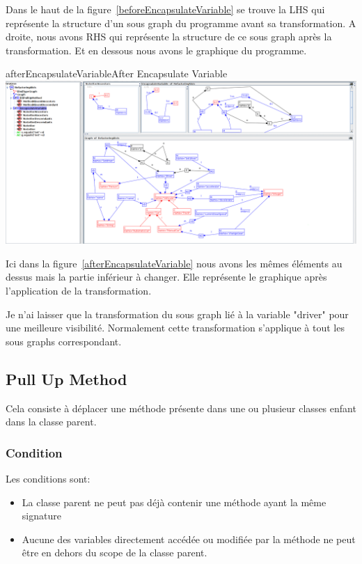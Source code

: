 \documentclass[a4paper, 12pt]{article}
\begin{document}
\begin{enumerate}
Dans le haut de la figure~\ref{beforeEncapsulateVariable} se trouve la LHS qui représente la structure d'un sous graph du programme avant sa transformation. A droite, nous avons RHS qui représente la structure de ce sous graph après la transformation. Et en dessous nous avons le graphique du programme.

\begin{myfig}{afterEncapsulateVariable}{After Encapsulate Variable}
\includegraphics[width=\textwidth]{afterEncapsulateVariable.png}
\end{myfig}

Ici dans la figure~\ref{afterEncapsulateVariable} nous avons les mêmes éléments au dessus mais la partie inférieur à changer. 
Elle représente le graphique après l'application de la transformation. 

Je n'ai laisser que la transformation du sous graph lié à la variable "driver" pour une meilleure visibilité. Normalement cette transformation s'applique à tout les sous graphs correspondant.


\subsection{Pull Up Method}

Cela consiste à déplacer une méthode présente dans une ou plusieur classes enfant dans la classe parent. 

\subsubsection{Condition}
Les conditions sont:
\begin{itemize}
\item La classe parent ne peut pas déjà contenir une méthode ayant la même signature
\item Aucune des variables directement accédée ou modifiée par la méthode ne peut être en dehors du scope de la classe parent.
\end{itemize}


\end{enumerate}
\end{document}

